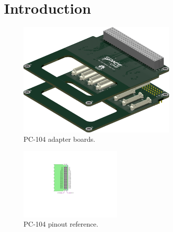 %
%
%
%
%

%
%
%
%
%
%

\chapter{Introduction} \label{ch:introduction}

\cite{pc104-adapter}

\cite{kicad}

\begin{figure}[!htb]
    \begin{center}
        \includegraphics[width=0.7\textwidth]{figures/pc104-adapter}
        \caption{PC-104 adapter boards.}
        \label{fig:pc104-adapter}
    \end{center}
\end{figure}

\begin{figure}[!htb]
    \begin{center}
        \includegraphics[width=0.45\textwidth]{figures/pc104-diagram}
        \caption{PC-104 pinout reference.}
        \label{fig:pc104-reference}
    \end{center}
\end{figure}
